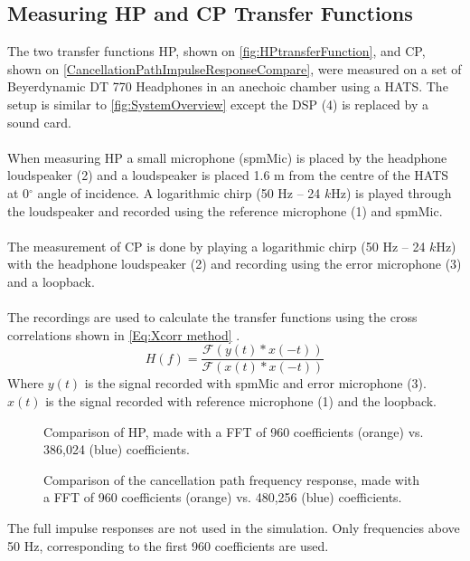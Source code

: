 \subsection{Measuring HP and CP Transfer Functions}
The two transfer functions HP, shown on \autoref{fig:HPtransferFunction}, and CP, shown on \autoref{CancellationPathImpulseResponseCompare}, were measured on a set of Beyerdynamic DT 770 Headphones in an anechoic chamber using a HATS. The setup is similar to \autoref{fig:SystemOverview} except the DSP (4) is replaced by a sound card. 
\\\\
When measuring HP a small microphone (spmMic) is placed by the headphone loudspeaker (2) and a loudspeaker is placed 1.6 m from the centre of the HATS at 0$^\circ$ angle of incidence. A logarithmic chirp (50 Hz -- 24 $k$Hz) is played through the loudspeaker and recorded using the reference microphone (1) and spmMic. 
\\\\{}
The measurement of CP is done by playing a logarithmic chirp (50 Hz -- 24 $k$Hz) with the headphone loudspeaker (2) and recording using the error microphone (3) and a loopback.
\\\\
The recordings are used to calculate the transfer functions using the cross correlations shown in \autoref{Eq:Xcorr method} \cite{TutorialMeasurementPowerSpectra}.   
\begin{equation}
H(f)=\dfrac{\mathscr{F}(y(t)\ast x(-t))} {\mathscr{F}(x(t)\ast x(-t))}
\label{Eq:Xcorr method}
\end{equation}
Where $y(t)$ is the signal recorded with spmMic and error microphone (3). $x(t)$ is the signal recorded with reference microphone (1) and the loopback.    
\begin{figure}[H]
	\centering
	
	\caption{Comparison of HP, made with a FFT of 960 coefficients (orange) vs. 386,024 (blue) coefficients.}
	\label{fig:HPtransferFunction}
\end{figure}

\begin{figure}[H]
	\centering
	
	\caption{Comparison of the cancellation path frequency response, made with a FFT of 960 coefficients (orange) vs. 480,256 (blue) coefficients.}
	\label{CancellationPathImpulseResponseCompare}
\end{figure}
The full impulse responses are not used in the simulation. Only frequencies above 50 Hz, corresponding to the first 960 coefficients are used.

